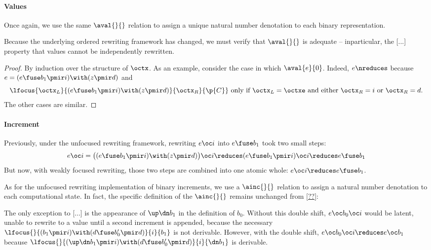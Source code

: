 \paragraph*{Values}
Once again, we use the same $\aval{}{}$ relation to assign a unique natural number denotation to each binary representation.
\begin{inferences}
  \ooavalrules
\end{inferences}
Because the underlying ordered rewriting framework has changed, we must verify that $\aval{}{}$ is adequate -- inparticular, the [...] property that values cannot be independently rewritten.
%
\ooavaltheorem
\begin{proof}
  By induction over the structure of $\octx$.
  As an example, consider the case in which $\aval{e}{0}$.
  Indeed, $e \nreduces$ because $e = (e \fuse b_1 \pmir i) \with (z \pmir d)$ and
  \begin{equation*}
    \lfocus{\octx_L}{(e \fuse b_1 \pmir i) \with (z \pmir d)}{\octx_R}{\p{C}}
    \text{\ only if $\octx_L = \octxe$ and either $\octx_R = i$ or $\octx_R = d$.}
  \end{equation*}
  The other cases are similar.
\end{proof}

\paragraph*{Increment}
Previously, under the unfocused rewriting framework, rewriting $e \oc i$ into $e \fuse b_1$ took two small steps:
\begin{equation*}
  e \oc i = \bigl((e \fuse b_1 \pmir i) \with (z \pmir d)\bigr) \oc i
    \reduces (e \fuse b_1 \pmir i) \oc i
    \reduces e \fuse b_1
\end{equation*}
But now, with weakly focused rewriting, those two steps are combined into one atomic whole: $e \oc i \reduces e \fuse b_1$.

As for the unfocused rewriting implementation of binary increments, we use a $\ainc{}{}$ relation to assign a natural number denotation to each computational state.
In fact, the specific definition of the $\ainc{}{}$ remains unchanged from \cref{??}: 
\begin{inferences}
  \aincrules
\end{inferences}

The only exception to [...] is the appearance of $\up \dn b_1$ in the definition of $b_0$.
Without this double shift, $e \oc b_0 \oc i$ would be latent, unable to rewrite to a value until a second increment is appended, because the necessary $\lfocus{}{(b_1 \pmir i) \with (d \fuse b'_0 \pmir d)}{i}{b_1}$ is not derivable.
However, with the double shift, $e \oc b_0 \oc i \reduces e \oc b_1$ because $\lfocus{}{(\up \dn b_1 \pmir i) \with (d \fuse b'_0 \pmir d)}{i}{\dn b_1}$ is derivable.


